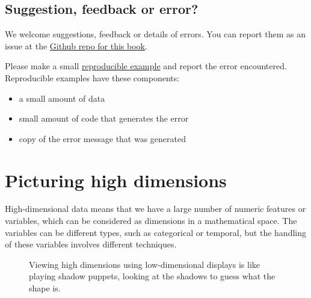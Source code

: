 \documentclass[
  letterpaper,
]{krantz}
\providecommand{\tightlist}{%
  \setlength{\itemsep}{0pt}\setlength{\parskip}{0pt}}\usepackage{longtable,booktabs,array}
\begin{document}
\section*{Suggestion, feedback or
error?}\label{suggestion-feedback-or-error}


We welcome suggestions, feedback or details of errors. You can report
them as an issue at the
\href{https://github.com/dicook/mulgar_book}{Github repo for this book}.

Please make a small \href{https://reprex.tidyverse.org}{reproducible
example} and report the error encountered. Reproducible examples have
these components:

\begin{itemize}
\tightlist
\item
  a small amount of data
\item
  small amount of code that generates the error
\item
  copy of the error message that was generated
\end{itemize}


\chapter{Picturing high dimensions}\label{intro}

High-dimensional data means that we have a large number of numeric
features or variables, which can be considered as dimensions in a
mathematical space. The variables can be different types, such as
categorical or temporal, but the handling of these variables involves
different techniques. 
 

\begin{figure}


\caption{\label{fig-shadow-puppets}Viewing high dimensions using
low-dimensional displays is like playing shadow puppets, looking at the
shadows to guess what the shape is.}

\end{figure}%
\end{document}
